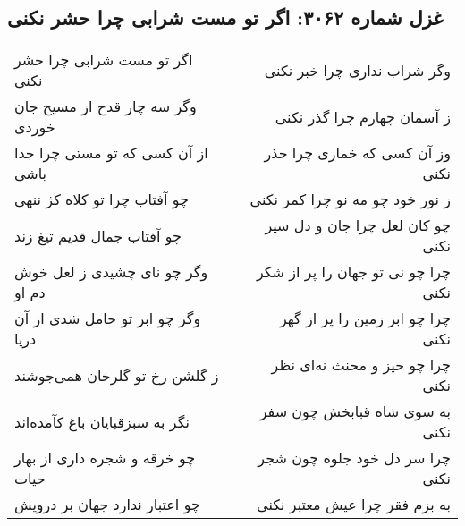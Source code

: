 \begin{center}
\section*{غزل شماره ۳۰۶۲: اگر تو مست شرابی چرا حشر نکنی}
\label{sec:3062}
\begin{longtable}{l p{0.5cm} r}
اگر تو مست شرابی چرا حشر نکنی
&&
وگر شراب نداری چرا خبر نکنی
\\
وگر سه چار قدح از مسیح جان خوردی
&&
ز آسمان چهارم چرا گذر نکنی
\\
از آن کسی که تو مستی چرا جدا باشی
&&
وز آن کسی که خماری چرا حذر نکنی
\\
چو آفتاب چرا تو کلاه کژ ننهی
&&
ز نور خود چو مه نو چرا کمر نکنی
\\
چو آفتاب جمال قدیم تیغ زند
&&
چو کان لعل چرا جان و دل سپر نکنی
\\
وگر چو نای چشیدی ز لعل خوش دم او
&&
چرا چو نی تو جهان را پر از شکر نکنی
\\
وگر چو ابر تو حامل شدی از آن دریا
&&
چرا چو ابر زمین را پر از گهر نکنی
\\
ز گلشن رخ تو گلرخان همی‌جوشند
&&
چرا چو حیز و محنث نه‌ای نظر نکنی
\\
نگر به سبزقبایان باغ کآمده‌اند
&&
به سوی شاه قبابخش چون سفر نکنی
\\
چو خرقه و شجره داری از بهار حیات
&&
چرا سر دل خود جلوه چون شجر نکنی
\\
چو اعتبار ندارد جهان بر درویش
&&
به بزم فقر چرا عیش معتبر نکنی
\\
\end{longtable}
\end{center}

